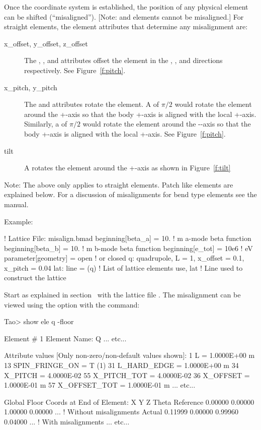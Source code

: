 \documentclass{hitec}     %
\begin{document}
Once the  coordinate system is established, the position of any physical element
can be shifted (``misaligned''). [Note:  and  elements cannot be misaligned.]
For straight elements, the element attributes that determine any misalignment are:
\begin{description}
\item[x_offset, y_offset, z_offset] \Newline
The , , and  attributes offset the element in the , ,
and  directions respectively. See Figure~\ref{f:pitch}.
%
\item[x_pitch, y_pitch] \Newline
The  and  attributes rotate the element. A  of $\pi/2$ would rotate the
element around the +-axis so that the body +-axis is aligned with the local
+-axis. Similarly, a  of $\pi/2$ would rotate the element around the --axis so
that the body +-axis is aligned with the local +-axis. See Figure~\ref{f:pitch}.
%
\item[tilt] \Newline
A  rotates the element around the +-axis as shown in Figure~\ref{f:tilt}
\end{description}

Note: The above only applies to straight elements. Patch like elements are explained below. For a
discussion of misalignments for bend type elements see the \bmad manual.

Example:
\begin{code}
! Lattice File: misalign.bmad
beginning[beta_a] = 10.   ! m  a-mode beta function
beginning[beta_b] = 10.   ! m  b-mode beta function
beginning[e_tot] = 10e6   ! eV
parameter[geometry] = open  ! or closed
q: quadrupole, L = 1, x_offset = 0.1, x_pitch = 0.04
lat: line = (q)   ! List of lattice elements
use, lat          ! Line used to construct the lattice
\end{code}

Start \tao as explained in section~ with the lattice file . The
misalignment can be viewed using the  option with the  command:
\begin{code} 
Tao> show ele q -floor

 Element #                1
 Element Name: Q
... etc...

 Attribute values [Only non-zero/non-default values shown]:
    1  L               =  1.0000E+00 m
   13  SPIN_FRINGE_ON  =  T (1)
   31  L_HARD_EDGE     =  1.0000E+00 m
   34  X_PITCH         =  4.0000E-02       55  X_PITCH_TOT   =  4.0000E-02
   36  X_OFFSET        =  1.0000E-01 m     57  X_OFFSET_TOT  =  1.0000E-01 m
... etc...

Global Floor Coords at End of Element:
                X        Y        Z    Theta  
Reference  0.00000  0.00000  1.00000  0.00000 ... ! Without misalignments
Actual     0.11999  0.00000  0.99960  0.04000 ... ! With misalignments
... etc...
\end{code}
\end{document}
